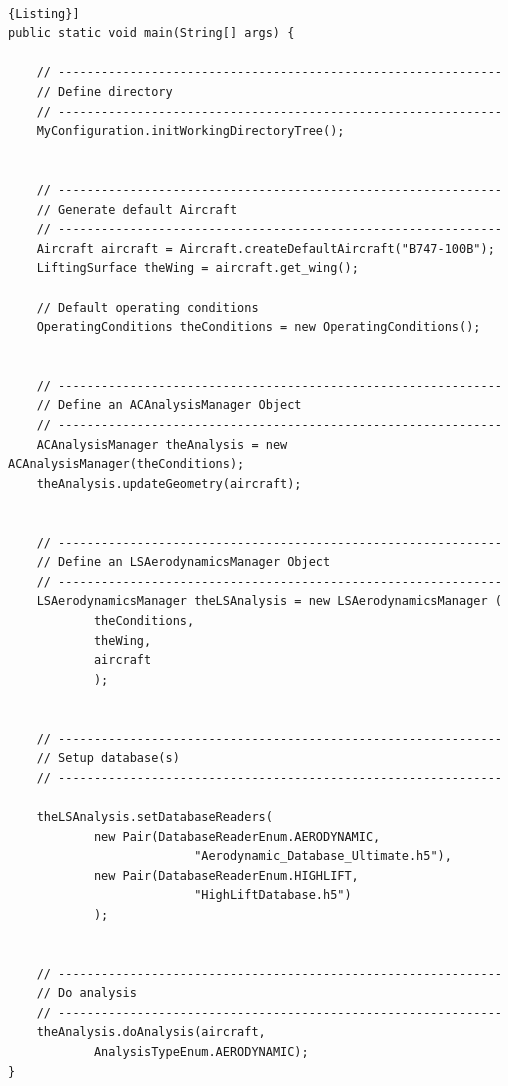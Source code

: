\noindent \\
\begin{lstlisting}[frame=rbl,caption={{\footnotesize Generation of default aircraft}},label= [style=\bfseries]{Listing}]
public static void main(String[] args) {

	// --------------------------------------------------------------
	// Define directory
	// --------------------------------------------------------------
	MyConfiguration.initWorkingDirectoryTree();


	// --------------------------------------------------------------
	// Generate default Aircraft
	// --------------------------------------------------------------
	Aircraft aircraft = Aircraft.createDefaultAircraft("B747-100B");
	LiftingSurface theWing = aircraft.get_wing();

	// Default operating conditions
	OperatingConditions theConditions = new OperatingConditions();		


	// --------------------------------------------------------------
	// Define an ACAnalysisManager Object
	// --------------------------------------------------------------
	ACAnalysisManager theAnalysis = new ACAnalysisManager(theConditions);
	theAnalysis.updateGeometry(aircraft);


	// --------------------------------------------------------------
	// Define an LSAerodynamicsManager Object
	// --------------------------------------------------------------
	LSAerodynamicsManager theLSAnalysis = new LSAerodynamicsManager ( 
			theConditions,
			theWing,
			aircraft
			);

		
	// --------------------------------------------------------------
	// Setup database(s)	
	// --------------------------------------------------------------
		
	theLSAnalysis.setDatabaseReaders(
			new Pair(DatabaseReaderEnum.AERODYNAMIC,
                          "Aerodynamic_Database_Ultimate.h5"),
			new Pair(DatabaseReaderEnum.HIGHLIFT,  
                          "HighLiftDatabase.h5")
			);

	
	// --------------------------------------------------------------
	// Do analysis
	// --------------------------------------------------------------
	theAnalysis.doAnalysis(aircraft, 
			AnalysisTypeEnum.AERODYNAMIC);
}
\end{lstlisting}

